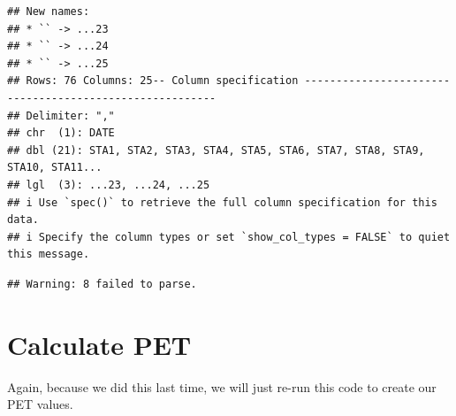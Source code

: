 \documentclass[
]{book}
\begin{document}
\begin{verbatim}
## New names:
## * `` -> ...23
## * `` -> ...24
## * `` -> ...25
## Rows: 76 Columns: 25-- Column specification --------------------------------------------------------
## Delimiter: ","
## chr  (1): DATE
## dbl (21): STA1, STA2, STA3, STA4, STA5, STA6, STA7, STA8, STA9, STA10, STA11...
## lgl  (3): ...23, ...24, ...25
## i Use `spec()` to retrieve the full column specification for this data.
## i Specify the column types or set `show_col_types = FALSE` to quiet this message.
\end{verbatim}

\begin{verbatim}
## Warning: 8 failed to parse.
\end{verbatim}

\hypertarget{calculate-pet-1}{%
\section{Calculate PET}\label{calculate-pet-1}}

Again, because we did this last time, we will just re-run this code to create our PET values.
\end{document}
